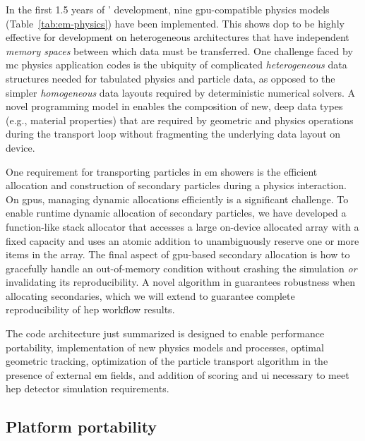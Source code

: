 In the first 1.5 years of \celeritas' development, nine \ac{gpu}-compatible
physics models (Table~\ref{tab:em-physics}) have been implemented. This shows
\ac{dop} to be highly effective for development on heterogeneous architectures
that have independent \emph{memory spaces} between which data must be
transferred. One challenge faced by \ac{mc} physics application codes is the
ubiquity of complicated \emph{heterogeneous} data structures needed for
tabulated physics and particle data, as opposed to the simpler
\emph{homogeneous} data layouts required by deterministic numerical solvers. A
novel programming model in \celeritas enables the composition of new, deep data
types (e.g., material properties) that are required by geometric and physics
operations during the transport loop without fragmenting the underlying data
layout on device.

One requirement for transporting particles in \ac{em} showers is the efficient
allocation and construction of secondary particles during a physics interaction.
On \acp{gpu}, managing dynamic allocations efficiently is a significant
challenge.  To enable runtime dynamic allocation of secondary particles, we have
developed a function-like stack allocator that accesses a large on-device
allocated array with a fixed capacity and uses an atomic addition to
unambiguously reserve one or more items in the array. The final aspect of
\ac{gpu}-based secondary allocation is how to gracefully handle an out-of-memory
condition without crashing the simulation \emph{or} invalidating its
reproducibility. A novel algorithm in \celeritas guarantees robustness when
allocating secondaries, which we will extend to guarantee complete
reproducibility of \ac{hep} workflow results.

The \celeritas code architecture just summarized is designed to enable 
performance portability,  implementation of new physics models and
processes,  optimal geometric tracking,  optimization of the
particle transport algorithm in the presence of external \ac{em} fields, and
 addition of scoring and \ac{ui} necessary to meet \acs{hep} detector
simulation requirements.

\subsection{Platform portability}

